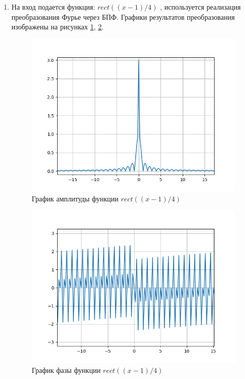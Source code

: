 {\begin{enumerate}
{			Как можно видеть, численное преобразование Фурье, посчитанное с помощью метода прямоугольников совпадает с преобразованием Фурье, вычисленным с помощью алгоритма БПФ.
		}
		
		\item{
		На вход подается функция: $rect((x-1)/4)$ , используется реализация преобразования Фурье через БПФ. Графики результатов преобразования изображены на рисунках \ref{my_fft_ampl}, \ref{my_fft_phase}.
		
			\begin{figure}[H]
				\begin{center}
				\includegraphics[scale=0.7]{my_fft_ampl}
				\caption{График амплитуды функции $rect((x-1)/4)$}
				\label{my_fft_ampl}
				\end{center}
			\end{figure}
		
		\begin{figure}[H]
			\begin{center}
			\includegraphics[scale=0.7]{my_fft_phase}
			\caption{График фазы функции $rect((x-1)/4)$}
			\label{my_fft_phase}
			\end{center}
		\end{figure}
		}
		

\end{enumerate}}
